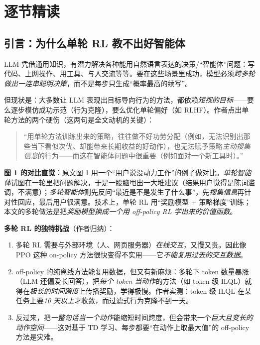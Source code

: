 \documentclass[11pt,UTF8,fontset=fandol]{ctexart}
\begin{document}
\section{逐节精读}

\subsection{引言：为什么单轮 RL 教不出好智能体}

LLM 凭借通用知识，有潜力解决各种能用自然语言表达的决策/“智能体”问题：写代码、上网操作、用工具、与人交流等等。要在这些场景里成功，模型必须\emph{跨多轮做出一连串聪明决策}，而不是每步只生成“概率最高的续写”。

但现状是：大多数让 LLM 表现出目标导向行为的方法，都依赖\emph{短视的目标}——要么逐步模仿成功示范（行为克隆），要么优化单轮偏好（如 RLHF）。作者点出单轮方法的两个硬伤（这两句是全文动机的关键）：

\begin{quote}
“用单轮方法训练出来的策略，往往做不好功劳分配（例如，无法识别出那些当下看似次优、却能带来长期收益的好动作），也无法赋予策略\emph{主动搜集信息}的行为——而这在智能体问题中很重要（例如面对一个新工具时）。”
\end{quote}

\textbf{图 1 的对比直觉}：原文图 1 用一个“用户说没动力工作”的例子做对比。\emph{单轮智能体}试图在一轮里把问题解决，于是一股脑甩出一大堆建议（结果用户觉得是陈词滥调，不满意）；\emph{多轮智能体}则先反问“最近是不是发生了什么事”，先\emph{搜集信息}再针对性回应，最后用户很满意。技术上，单轮 RL 用“奖励模型 + 策略梯度”训练；本文的多轮做法是把\emph{奖励模型换成一个用 off-policy RL 学出来的价值函数}。

\textbf{多轮 RL 的独特挑战}（作者归纳）：
\begin{enumerate}[leftmargin=1.6em]
\item 多轮 RL 需要与外部环境（人、网页服务器）\emph{在线交互}，又慢又贵。因此像 PPO 这种 on-policy 方法很快变得不实用——它\emph{不能复用过去的交互数据}。
\item off-policy 的纯离线方法能复用数据，但又有新麻烦：多轮下 token 数量暴涨（LLM 还偏爱长回答），把\emph{每个 token 当动作}的方法（如 token 级 ILQL）就得在\emph{极长的时间跨度}上传播奖励，学得极慢。作者实测：token 级 ILQL 在某任务上要\emph{10 天以上}才收敛，而过滤式行为克隆不到一天。
\item 反过来，把\emph{一整句话当一个动作}能缩短时间跨度，但会带来一个\emph{巨大且变长的动作空间}——这对基于 TD 学习、每步都要“在动作上取最大值”的 off-policy 方法是灾难。
\end{enumerate}
\end{document}
